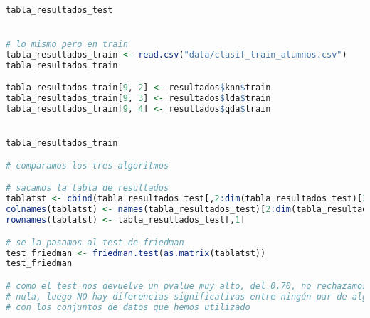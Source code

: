 \begin{lstlisting}[language=R]
tabla_resultados_test


# lo mismo pero en train
tabla_resultados_train <- read.csv("data/clasif_train_alumnos.csv")
tabla_resultados_train

tabla_resultados_train[9, 2] <- resultados$knn$train
tabla_resultados_train[9, 3] <- resultados$lda$train
tabla_resultados_train[9, 4] <- resultados$qda$train


tabla_resultados_train

# comparamos los tres algoritmos

# sacamos la tabla de resultados
tablatst <- cbind(tabla_resultados_test[,2:dim(tabla_resultados_test)[2]])
colnames(tablatst) <- names(tabla_resultados_test)[2:dim(tabla_resultados_test)[2]]
rownames(tablatst) <- tabla_resultados_test[,1]

# se la pasamos al test de friedman
test_friedman <- friedman.test(as.matrix(tablatst))
test_friedman

# como el test nos devuelve un pvalue muy alto, del 0.70, no rechazamos la hipotesis
# nula, luego NO hay diferencias significativas entre ningún par de algoritmos
# con los conjuntos de datos que hemos utilizado
\end{lstlisting}
